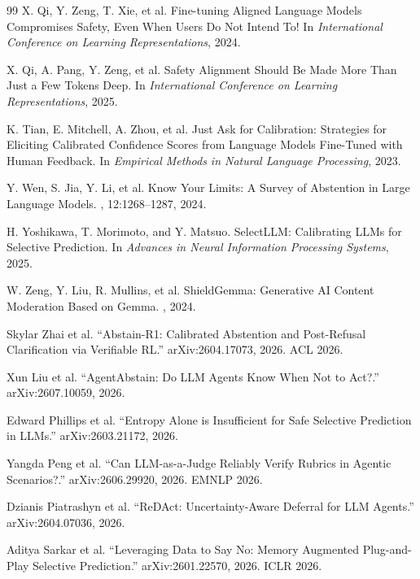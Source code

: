 \begin{thebibliography}{99}
X. Qi, Y. Zeng, T. Xie, et al.
\newblock Fine-tuning Aligned Language Models Compromises Safety, Even When Users Do Not Intend To!
\newblock In {\em International Conference on Learning Representations}, 2024.

X. Qi, A. Pang, Y. Zeng, et al.
\newblock Safety Alignment Should Be Made More Than Just a Few Tokens Deep.
\newblock In {\em International Conference on Learning Representations}, 2025.

K. Tian, E. Mitchell, A. Zhou, et al.
\newblock Just Ask for Calibration: Strategies for Eliciting Calibrated Confidence Scores from Language Models Fine-Tuned with Human Feedback.
\newblock In {\em Empirical Methods in Natural Language Processing}, 2023.

Y. Wen, S. Jia, Y. Li, et al.
\newblock Know Your Limits: A Survey of Abstention in Large Language Models.
, 12:1268--1287, 2024.

H. Yoshikawa, T. Morimoto, and Y. Matsuo.
\newblock SelectLLM: Calibrating LLMs for Selective Prediction.
\newblock In {\em Advances in Neural Information Processing Systems}, 2025.

W. Zeng, Y. Liu, R. Mullins, et al.
\newblock ShieldGemma: Generative AI Content Moderation Based on Gemma.
, 2024.


Skylar Zhai et al.
``Abstain-R1: Calibrated Abstention and Post-Refusal Clarification via Verifiable RL.''
arXiv:2604.17073, 2026. ACL 2026.

Xun Liu et al.
``AgentAbstain: Do LLM Agents Know When Not to Act?.''
arXiv:2607.10059, 2026.

Edward Phillips et al.
``Entropy Alone is Insufficient for Safe Selective Prediction in LLMs.''
arXiv:2603.21172, 2026.

Yangda Peng et al.
``Can LLM-as-a-Judge Reliably Verify Rubrics in Agentic Scenarios?.''
arXiv:2606.29920, 2026. EMNLP 2026.

Dzianis Piatrashyn et al.
``ReDAct: Uncertainty-Aware Deferral for LLM Agents.''
arXiv:2604.07036, 2026.

Aditya Sarkar et al.
``Leveraging Data to Say No: Memory Augmented Plug-and-Play Selective Prediction.''
arXiv:2601.22570, 2026. ICLR 2026.


\end{thebibliography}
